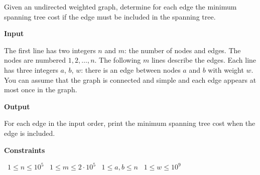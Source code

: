 Given an undirected weighted graph, determine for each edge the minimum spanning tree cost if the edge must be included in the spanning tree.

\vspace{0.3cm}\noindent\textbf{Input}

The first line has two integers $n$ and $m$: the number of nodes and edges. The nodes are numbered $1,2,\dots,n$.
The following $m$ lines describe the edges. Each line has three integers $a$, $b$, $w$: there is an edge between nodes $a$ and $b$ with weight $w$.
You can assume that the graph is connected and simple and each edge appears at most once in the graph.

\vspace{0.3cm}\noindent\textbf{Output}

For each edge in the input order, print the minimum spanning tree cost when the edge is included.

\vspace{0.3cm}\noindent\textbf{Constraints}

\textbullet\ $1 \le n \le 10^5$
\textbullet\ $1 \le m \le 2 \cdot 10^5$
\textbullet\ $1 \le a,b \le n$
\textbullet\ $1 \le w \le 10^9$
